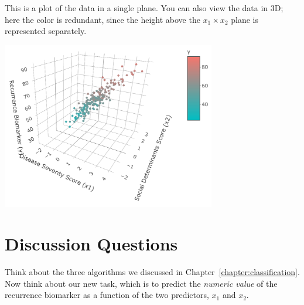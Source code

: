 This is a plot of the data in a single plane. You can also view the data in 3D; here the color is redundant, since the height above the $x_1 \times x_2$ plane is represented separately.

\begin{center}
\includegraphics[width=0.7\textwidth]{img/esl-reg-3d-view-2.png}
\end{center}


\section{Discussion Questions}

Think about the three algorithms we discussed in Chapter~\ref{chapter:classification}. Now think about our new task, which is to predict the \emph{numeric value} of the recurrence biomarker as a function of the two predictors, $x_1$ and $x_2$. 


